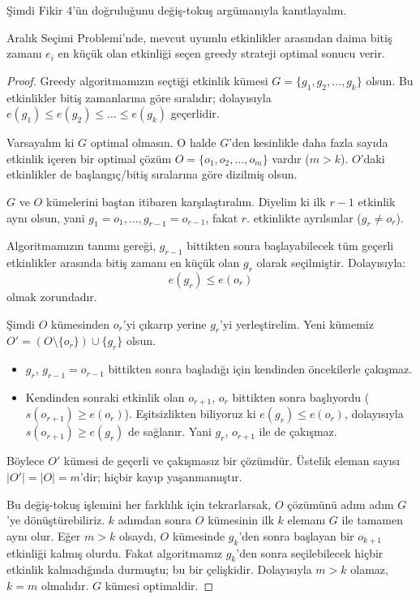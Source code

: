 Şimdi Fikir 4'ün doğruluğunu değiş-tokuş argümanıyla kanıtlayalım.

\begin{theorem}
Aralık Seçimi Problemi'nde, mevcut uyumlu etkinlikler arasından daima bitiş zamanı $e_i$ en küçük olan etkinliği seçen greedy strateji optimal sonucu verir.
\end{theorem}

\begin{proof}
Greedy algoritmamızın seçtiği etkinlik kümesi $G = \{g_1, g_2, \dots, g_k\}$ olsun. Bu etkinlikler bitiş zamanlarına göre sıralıdır; dolayısıyla $e(g_1) \le e(g_2) \le \dots \le e(g_k)$ geçerlidir.

Varsayalım ki $G$ optimal olmasın. O halde $G$'den kesinlikle daha fazla sayıda etkinlik içeren bir optimal çözüm $O = \{o_1, o_2, \dots, o_m\}$ vardır ($m > k$). $O$'daki etkinlikler de başlangıç/bitiş sıralarına göre dizilmiş olsun.

$G$ ve $O$ kümelerini baştan itibaren karşılaştıralım. Diyelim ki ilk $r-1$ etkinlik aynı olsun, yani $g_1 = o_1, \dots, g_{r-1} = o_{r-1}$, fakat $r$. etkinlikte ayrılsınlar ($g_r \ne o_r$).

Algoritmamızın tanımı gereği, $g_{r-1}$ bittikten sonra başlayabilecek tüm geçerli etkinlikler arasında bitiş zamanı en küçük olan $g_r$ olarak seçilmiştir. Dolayısıyla:
\[
e(g_r) \le e(o_r)
\]
olmak zorundadır.

Şimdi $O$ kümesinden $o_r$'yi çıkarıp yerine $g_r$'yi yerleştirelim. Yeni kümemiz $O' = (O \setminus \{o_r\}) \cup \{g_r\}$ olsun.
\begin{itemize}
    \item $g_r$, $g_{r-1} = o_{r-1}$ bittikten sonra başladığı için kendinden öncekilerle çakışmaz.
    \item Kendinden sonraki etkinlik olan $o_{r+1}$, $o_r$ bittikten sonra başlıyordu ($s(o_{r+1}) \ge e(o_r)$). Eşitsizlikten biliyoruz ki $e(g_r) \le e(o_r)$, dolayısıyla $s(o_{r+1}) \ge e(g_r)$ de sağlanır. Yani $g_r$, $o_{r+1}$ ile de çakışmaz.
\end{itemize}
Böylece $O'$ kümesi de geçerli ve çakışmasız bir çözümdür. Üstelik eleman sayısı $|O'| = |O| = m$'dir; hiçbir kayıp yaşanmamıştır.

Bu değiş-tokuş işlemini her farklılık için tekrarlarsak, $O$ çözümünü adım adım $G$'ye dönüştürebiliriz. $k$ adımdan sonra $O$ kümesinin ilk $k$ elemanı $G$ ile tamamen aynı olur. Eğer $m > k$ olsaydı, $O$ kümesinde $g_k$'den sonra başlayan bir $o_{k+1}$ etkinliği kalmış olurdu. Fakat algoritmamız $g_k$'den sonra seçilebilecek hiçbir etkinlik kalmadığında durmuştu; bu bir çelişkidir. Dolayısıyla $m > k$ olamaz, $k = m$ olmalıdır. $G$ kümesi optimaldir.
\end{proof}

